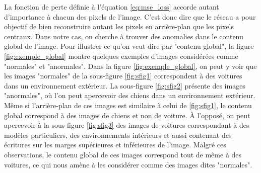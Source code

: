 La fonction de perte définie à l'équation \ref{eq:mse_loss} accorde autant d'importance à chacun des pixels de l'image. C'est donc dire que le réseau a pour objectif de bien reconstruire autant les pixels en arrière-plan que les pixels centraux. Dans notre cas,  on cherche à trouver des anomalies dans le contenu global de l'image. Pour illustrer ce qu'on veut dire par "contenu global", la figure \ref{fig:exemple_global} montre quelques exemples d'images considérées comme "normales" et "anormales". Dans la figure \ref{fig:exemple_global}, on peut y voir que les images "normales" de la sous-figure \ref{fig:sfig1} correspondent à des voitures dans un environnement extérieur. La sous-figure \ref{fig:sfig2} présente des images "anormales", où l'on peut apercevoir des chiens dans un environnement extérieur. Même si l'arrière-plan de ces images est similaire à celui de \ref{fig:sfig1}, le contenu global correspond à des images de chiens et non de voiture. À l'opposé, on peut apercevoir à la sous-figure \ref{fig:sfig3} des images de voitures correspondant à des modèles particuliers, des environnements intérieurs et aussi contenant des écritures sur les marges supérieures et inférieures de l'image. Malgré ces observations, le contenu global de ces images correspond tout de même à des voitures, ce qui nous amène à les considérer comme des images dites "normales".


